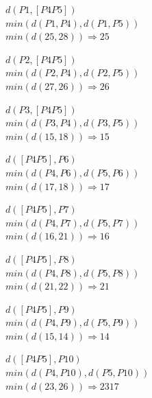 \documentclass{article}
\begin{document}
  \begin{center}
    $d(P1,[P4 P5])$ \\
    $min(d(P1,P4), d(P1, P5))$ \\
    $min(d(25, 28)) \Rightarrow 25$ \\
  \end{center}
  \begin{center}
    $d(P2,[P4 P5])$ \\
    $min(d(P2,P4), d(P2, P5))$ \\
    $min(d(27, 26)) \Rightarrow 26$ \\
  \end{center}
  \begin{center}
    $d(P3,[P4 P5])$ \\
    $min(d(P3,P4), d(P3, P5))$ \\
    $min(d(15, 18)) \Rightarrow 15$ \\
  \end{center}
  \begin{center}
    $d([P4 P5],P6)$ \\
    $min(d(P4,P6), d(P5, P6))$ \\
    $min(d(17, 18)) \Rightarrow 17$ \\
  \end{center}
  \begin{center}
    $d([P4 P5],P7)$ \\
    $min(d(P4,P7), d(P5, P7))$ \\
    $min(d(16, 21)) \Rightarrow 16$ \\
  \end{center}
  \begin{center}
    $d([P4 P5],P8)$ \\
    $min(d(P4,P8), d(P5, P8))$ \\
    $min(d(21, 22)) \Rightarrow 21$ \\
  \end{center}
  \begin{center}
    $d([P4 P5],P9)$ \\
    $min(d(P4,P9), d(P5, P9))$ \\
    $min(d(15, 14)) \Rightarrow 14$ \\
  \end{center}
  \begin{center}
    $d([P4 P5],P10)$ \\
    $min(d(P4,P10), d(P5, P10))$ \\
    $min(d(23, 26)) \Rightarrow 2317$ \\
  \end{center}
\end{document}
